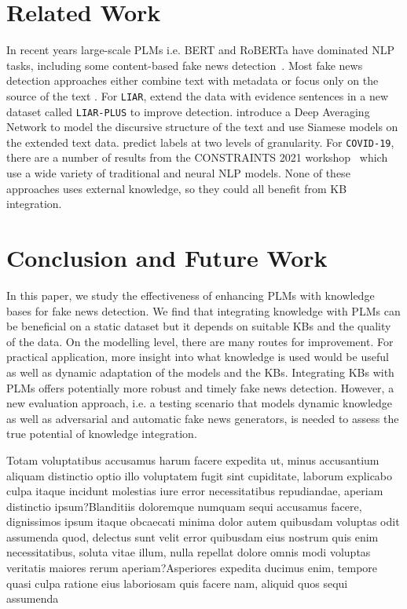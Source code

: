 \documentclass[letterpaper]{article} %
\begin{document}
\section{Related Work}

In recent years large-scale PLMs i.e. BERT and RoBERTa have dominated NLP tasks, including some content-based fake news detection~\cite{Kaliyar2021FakeBERT}.
Most fake news detection approaches either combine text with metadata \citep[e.g.][]{ding2020bert} or focus only on the source of the text \citep[e.g.][]{gruppi2022nela}.
For \texttt{LIAR}, \citet{alhindi-etal-2018-evidence} extend the data with evidence sentences in a new dataset called \texttt{LIAR-PLUS} to improve detection.
\citet{Chernyavskiy2020RecursiveNT} introduce a Deep Averaging Network to model the discursive structure of the text and use Siamese models on the extended text data.
\citet{Liu2019ATM} predict labels at two levels of granularity.
For \texttt{COVID-19}, there are a number of results from the CONSTRAINTS 2021 workshop~\cite{chakraborty2021combating} which use a wide variety of traditional and neural NLP models.
None of these approaches uses external knowledge, so they could all benefit from KB integration.


\section{Conclusion and Future Work}

In this paper, we study the effectiveness of enhancing PLMs with knowledge bases for fake news detection.
We find that integrating knowledge with PLMs can be beneficial on a static dataset but it depends on suitable KBs and the quality of the data.
On the modelling level, there are many routes for improvement.
For practical application, more insight into what knowledge is used would be useful as well as dynamic adaptation of the models and the KBs.
Integrating KBs with PLMs offers potentially more robust and timely fake news detection. However, a new evaluation approach, i.e. a testing scenario that models dynamic knowledge as well as adversarial and automatic fake news generators, is needed to assess the true potential of knowledge integration.


Totam voluptatibus accusamus harum facere expedita ut, minus accusantium aliquam distinctio optio illo voluptatem fugit sint cupiditate, laborum explicabo culpa itaque incidunt molestias iure error necessitatibus repudiandae, aperiam distinctio ipsum?Blanditiis doloremque numquam sequi accusamus facere, dignissimos ipsum itaque obcaecati minima dolor autem quibusdam voluptas odit assumenda quod, delectus sunt velit error quibusdam eius nostrum quis enim necessitatibus, soluta vitae illum, nulla repellat dolore omnis modi voluptas veritatis maiores rerum aperiam?Asperiores expedita ducimus enim, tempore quasi culpa ratione eius laboriosam quis facere nam, aliquid quos sequi assumenda

\end{document}
